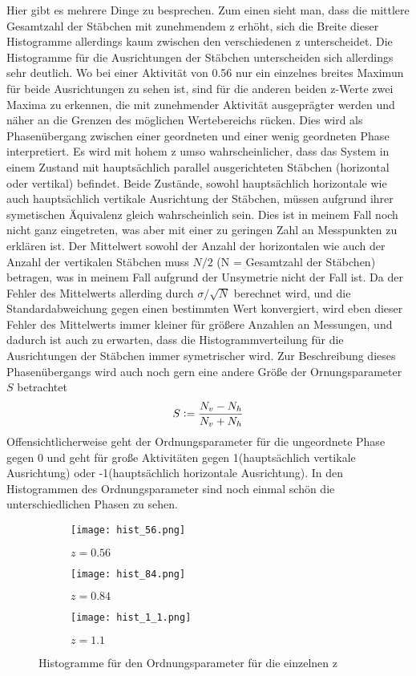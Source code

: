 \documentclass[12pt]{article}
\begin{document}
Hier gibt es mehrere Dinge zu besprechen. Zum einen sieht man, dass die mittlere Gesamtzahl der Stäbchen mit zunehmendem z erhöht, sich die Breite dieser Histogramme allerdings kaum zwischen den verschiedenen z unterscheidet. Die Histogramme für die Ausrichtungen der Stäbchen unterscheiden sich allerdings sehr deutlich. Wo bei einer Aktivität von 0.56 nur ein einzelnes breites Maximun für beide Ausrichtungen zu sehen ist, sind für die anderen beiden z-Werte zwei Maxima zu erkennen, die mit zunehmender Aktivität ausgeprägter werden und näher an die Grenzen des möglichen Wertebereichs rücken.\newline
Dies wird als Phasenübergang zwischen einer geordneten und einer wenig geordneten Phase interpretiert. Es wird mit hohem z umso wahrscheinlicher, dass das System in einem Zustand mit hauptsächlich parallel ausgerichteten Stäbchen (horizontal oder vertikal) befindet. Beide Zustände, sowohl hauptsächlich horizontale wie auch hauptsächlich vertikale Ausrichtung der Stäbchen, müssen aufgrund ihrer symetischen Äquivalenz gleich wahrscheinlich sein. Dies ist in meinem Fall noch nicht ganz eingetreten, was aber mit einer zu geringen Zahl an Messpunkten zu erklären ist. Der Mittelwert sowohl der Anzahl der horizontalen wie auch der Anzahl der vertikalen Stäbchen muss $N/2$ (N = Gesamtzahl der Stäbchen) betragen, was in meinem Fall aufgrund der Unsymetrie nicht der Fall ist. Da der Fehler des Mittelwerts allerding durch $\sigma/\sqrt{N}$ berechnet wird, und die Standardabweichung gegen einen bestimmten Wert konvergiert, wird eben dieser Fehler des Mittelwerts immer kleiner für größere Anzahlen an Messungen, und dadurch ist auch zu erwarten, dass die Histogrammverteilung für die Ausrichtungen der Stäbchen immer symetrischer wird.\newline\newline
Zur Beschreibung dieses Phasenübergangs wird auch noch gern eine andere Größe der Ornungsparameter $S$ betrachtet
$$S\vcentcolon=\frac{N_v-N_h}{N_v+N_h}$$
Offensichtlicherweise geht der Ordnungsparameter für die ungeordnete Phase gegen 0 und geht für große Aktivitäten gegen 1(hauptsächlich vertikale Ausrichtung) oder -1(hauptsächlich horizontale Ausrichtung). In den Histogrammen des Ordnungsparameter sind noch einmal schön die unterschiedlichen Phasen zu sehen.
\begin{figure}[H]\hspace*{-1.5cm}
    \begin{subfigure}{0.4\textwidth}
    \texttt{[image: hist\_56.png]}
    \caption{$z=0.56$
    }
    \end{subfigure}
    \hfill
    \begin{subfigure}{0.4\textwidth}
    \hspace*{-0.8cm}
    \texttt{[image: hist\_84.png]}
    \caption{$z=0.84$}
    \end{subfigure}
    \hfill
    \hspace*{-1.5cm}
    \begin{subfigure}{0.4\textwidth}
    \texttt{[image: hist\_1\_1.png]}
    \caption{$z=1.1$}
    \end{subfigure}
    \hfill
    \caption{Histogramme für den Ordnungsparameter für die einzelnen z}
\end{figure}
\end{document}
